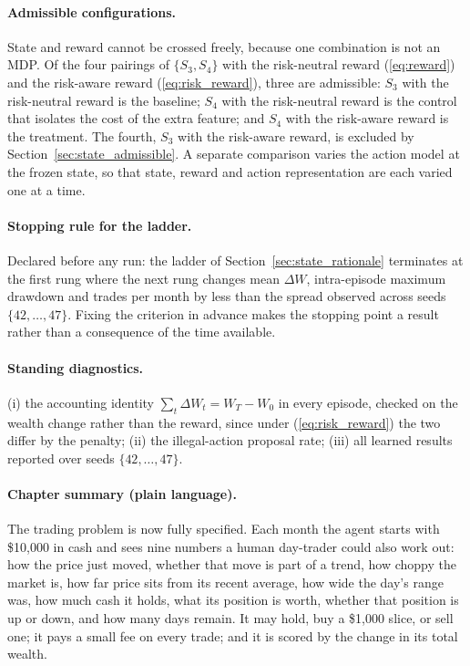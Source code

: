 \paragraph{Admissible configurations.} State and reward cannot be crossed
freely, because one combination is not an MDP. Of the four pairings of
$\{S_3, S_4\}$ with the risk-neutral reward (\ref{eq:reward}) and the
risk-aware reward (\ref{eq:risk_reward}), three are admissible: $S_3$ with
the risk-neutral reward is the baseline; $S_4$ with the risk-neutral
reward is the control that isolates the cost of the extra feature; and
$S_4$ with the risk-aware reward is the treatment. The fourth, $S_3$ with
the risk-aware reward, is excluded by
Section~\ref{sec:state_admissible}. A separate comparison varies the
action model at the frozen state, so that state, reward and action
representation are each varied one at a time.

\paragraph{Stopping rule for the ladder.} Declared before any run: the
ladder of Section~\ref{sec:state_rationale} terminates at the first rung
where the next rung changes mean $\Delta W$, intra-episode maximum
drawdown and trades per month by less than the spread observed across
seeds $\{42,\dots,47\}$. Fixing the criterion in advance makes the stopping
point a result rather than a consequence of the time available.

\paragraph{Standing diagnostics.} (i) the accounting identity
$\sum_t \Delta W_t = W_T - W_0$ in every episode, checked on the wealth
change rather than the reward, since under (\ref{eq:risk_reward}) the two
differ by the penalty; (ii) the illegal-action proposal rate; (iii) all
learned results reported over seeds $\{42,\dots,47\}$.

\paragraph{Chapter summary (plain language).} The trading problem is now
fully specified. Each month the agent starts with \$10,000 in cash and
sees nine numbers a human day-trader could also work out: how the price
just moved, whether that move is part of a trend, how choppy the market
is, how far price sits from its recent average, how wide the day's range
was, how much cash it holds, what its position is worth, whether that
position is up or down, and how many days remain. It may hold, buy a
\$1,000 slice, or sell one; it pays a small fee on every trade; and it is
scored by the change in its total wealth.

